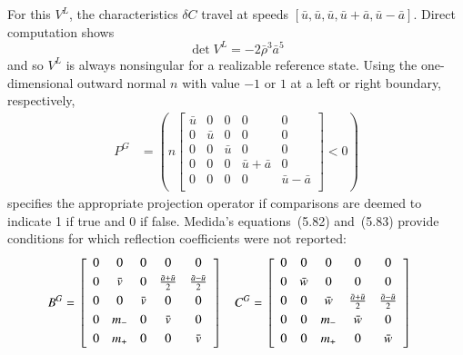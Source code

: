 \documentclass[letterpaper,11pt,nointlimits,reqno,draft]{amsbook}
\begin{document}
For this $V^L$, the characteristics $\delta{}C$ travel at speeds
$\left[\bar{u}, \bar{u}, \bar{u}, \bar{u}+\bar{a}, \bar{u}-\bar{a}\right]$.
Direct computation shows
\[
  \det V^L = -2\bar{\rho}^3\bar{a}^5
\]
and so $V^L$ is always nonsingular for a realizable reference state.  Using the
one-dimensional outward normal $n$ with value $-1$ or $1$ at a left or right
boundary, respectively,
\begin{align}
\label{eq:PGmedida}
  P^G
  &=
  \left(
  n
  \left[\begin{array}{ccccc}
    \bar{u} & 0       & 0       & 0                 & 0                 \\
    0       & \bar{u} & 0       & 0                 & 0                 \\
    0       & 0       & \bar{u} & 0                 & 0                 \\
    0       & 0       & 0       & \bar{u} + \bar{a} & 0                 \\
    0       & 0       & 0       & 0                 & \bar{u} - \bar{a} \\
  \end{array}\right]
  <
  0
  \right)
\end{align}
specifies the appropriate projection operator if comparisons are deemed to
indicate 1 if true and 0 if false.  Medida's equations~(5.82) and~(5.83) provide
conditions for which reflection coefficients were not reported:
\begin{align}
\label{eq:dimeulerapproxmedidaopt1}
  B^G &= \left[\begin{array}{ccccc}
    0 & 0       & 0       & 0                           & 0                         \\ \noalign{\smallskip}
    0 & \bar{v} & 0       & \frac{\bar{a} + \bar{u}}{2} & \frac{\bar{a}-\bar{u}}{2} \\ \noalign{\smallskip}
    0 & 0       & \bar{v} & 0                           & 0                         \\ \noalign{\smallskip}
    0 & m_{-}   & 0       & \bar{v}                     & 0                         \\ \noalign{\smallskip}
    0 & m_{+}   & 0       & 0                           & \bar{v}                   \\ \noalign{\smallskip}
  \end{array}\right]
&
  C^G &= \left[\begin{array}{ccccc}
    0 & 0       & 0       & 0                         & 0                         \\ \noalign{\smallskip}
    0 & \bar{w} & 0       & 0                         & 0                         \\ \noalign{\smallskip}
    0 & 0       & \bar{w} & \frac{\bar{a}+\bar{u}}{2} & \frac{\bar{a}-\bar{u}}{2} \\ \noalign{\smallskip}
    0 & 0       & m_{-}   & \bar{w}                   & 0                         \\ \noalign{\smallskip}
    0 & 0       & m_{+}   & 0                         & \bar{w}                   \\ \noalign{\smallskip}
  \end{array}\right]
\end{align}
\end{document}

